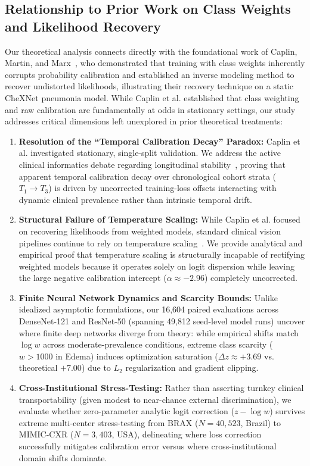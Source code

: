 \documentclass[preprint,12pt]{elsarticle}
\begin{document}
\subsection{Relationship to Prior Work on Class Weights and Likelihood Recovery}
Our theoretical analysis connects directly with the foundational work of Caplin, Martin, and Marx~\cite{caplin2022calibrating}, who demonstrated that training with class weights inherently corrupts probability calibration and established an inverse modeling method to recover undistorted likelihoods, illustrating their recovery technique on a static CheXNet pneumonia model. While Caplin et al. established that class weighting and raw calibration are fundamentally at odds in stationary settings, our study addresses critical dimensions left unexplored in prior theoretical treatments:
\begin{enumerate}
    \item \textbf{Resolution of the ``Temporal Calibration Decay'' Paradox:} Caplin et al. investigated stationary, single-split validation. We address the active clinical informatics debate regarding longitudinal stability~\cite{guo2022evaluation, hinson2022multisite, davis2020detection}, proving that apparent temporal calibration decay over chronological cohort strata ($T_1 \to T_3$) is driven by uncorrected training-loss offsets interacting with dynamic clinical prevalence rather than intrinsic temporal drift.
    \item \textbf{Structural Failure of Temperature Scaling:} While Caplin et al. focused on recovering likelihoods from weighted models, standard clinical vision pipelines continue to rely on temperature scaling~\cite{guo2017calibration}. We provide analytical and empirical proof that temperature scaling is structurally incapable of rectifying weighted models because it operates solely on logit dispersion while leaving the large negative calibration intercept ($\alpha \approx -2.96$) completely uncorrected.
    \item \textbf{Finite Neural Network Dynamics and Scarcity Bounds:} Unlike idealized asymptotic formulations, our 16,604 paired evaluations across DenseNet-121 and ResNet-50 (spanning 49,812 seed-level model runs) uncover where finite deep networks diverge from theory: while empirical shifts match $\log w$ across moderate-prevalence conditions, extreme class scarcity ($w > 1000$ in Edema) induces optimization saturation ($\Delta z \approx +3.69$ vs. theoretical $+7.00$) due to $L_2$ regularization and gradient clipping.
    \item \textbf{Cross-Institutional Stress-Testing:} Rather than asserting turnkey clinical transportability (given modest to near-chance external discrimination), we evaluate whether zero-parameter analytic logit correction ($z - \log w$) survives extreme multi-center stress-testing from BRAX ($N=40,523$, Brazil) to MIMIC-CXR ($N=3,403$, USA), delineating where loss correction successfully mitigates calibration error versus where cross-institutional domain shifts dominate.

\end{enumerate}
\end{document}
